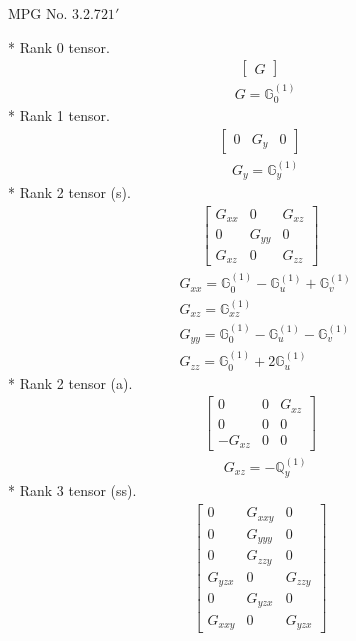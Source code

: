 \documentclass[fleqn,8pt,landscape]{jsarticle}
\begin{document}
\setcounter{MaxMatrixCols}{32}

\renewcommand{\tablename}{Table~}
\renewcommand{\figurename}{Figure~}
\begin{center}
\LARGE
MPG No. 3.2.7\quad$21'$
\end{center}
* Rank 0 tensor.
\begin{align*}
\begin{bmatrix} G \end{bmatrix}
\end{align*}
\begin{align*}
& G = \mathbb{G}_{0}^{(1)}
\end{align*}
* Rank 1 tensor.
\begin{align*}
\begin{bmatrix} 0 & G_{y} & 0 \end{bmatrix}
\end{align*}
\begin{align*}
& G_{y} = \mathbb{G}_{y}^{(1)}
\end{align*}
* Rank 2 tensor (s).
\begin{align*}
\begin{bmatrix} G_{xx} & 0 & G_{xz} \\ 0 & G_{yy} & 0 \\ G_{xz} & 0 & G_{zz} \end{bmatrix}
\end{align*}
\begin{align*}
& G_{xx} = \mathbb{G}_{0}^{(1)} - \mathbb{G}_{u}^{(1)} + \mathbb{G}_{v}^{(1)} \\
& G_{xz} = \mathbb{G}_{xz}^{(1)} \\
& G_{yy} = \mathbb{G}_{0}^{(1)} - \mathbb{G}_{u}^{(1)} - \mathbb{G}_{v}^{(1)} \\
& G_{zz} = \mathbb{G}_{0}^{(1)} + 2 \mathbb{G}_{u}^{(1)}
\end{align*}
* Rank 2 tensor (a).
\begin{align*}
\begin{bmatrix} 0 & 0 & G_{xz} \\ 0 & 0 & 0 \\ - G_{xz} & 0 & 0 \end{bmatrix}
\end{align*}
\begin{align*}
& G_{xz} = - \mathbb{Q}_{y}^{(1)}
\end{align*}
* Rank 3 tensor (ss).
\begin{align*}
\begin{bmatrix} 0 & G_{xxy} & 0 \\ 0 & G_{yyy} & 0 \\ 0 & G_{zzy} & 0 \\ G_{yzx} & 0 & G_{zzy} \\ 0 & G_{yzx} & 0 \\ G_{xxy} & 0 & G_{yzx} \end{bmatrix}
\end{align*}
\end{document}
